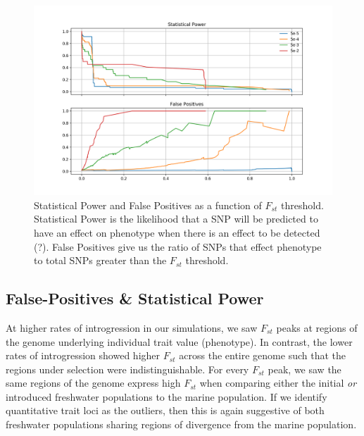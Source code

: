 \documentclass{article}
\newcommand{\plr}[1]{\todo[linecolor=blue,backgroundcolor=blue!25,bordercolor=blue]{#1}}
\begin{document}
\begin{figure}
	\begin{center}
  		\includegraphics[width=0.7\linewidth]{matplotlibPlots/Power_FP.png}
  		\caption{ 
		Statistical Power and False Positives as a function of $F_{st}$ threshold. 
		Statistical Power is the likelihood that a SNP will be predicted to have an effect on phenotype when there is an effect to be detected (?).
		False Positives give us the ratio of SNPs that effect phenotype to total SNPs greater than the $F_{st}$ threshold.
		}
  		\label{fig:Power_FP}
	\end{center}
\end{figure}


\subsection*{False-Positives \& Statistical Power}


At higher rates of introgression in our simulations, we saw $F_{st}$ peaks at regions of the genome underlying individual trait value (phenotype). 
In contrast, the lower rates of introgression showed higher $F_{st}$ across the entire genome such that the regions under selection were indistinguishable. 
For every $F_{st}$ peak, we saw the same regions of the genome express high $F_{st}$ when comparing either the initial \textit{or} introduced freshwater populations to the marine population.
If we identify quantitative trait loci as the outliers, then this is again suggestive of both freshwater populations sharing regions of divergence from the marine population.
\end{document}
